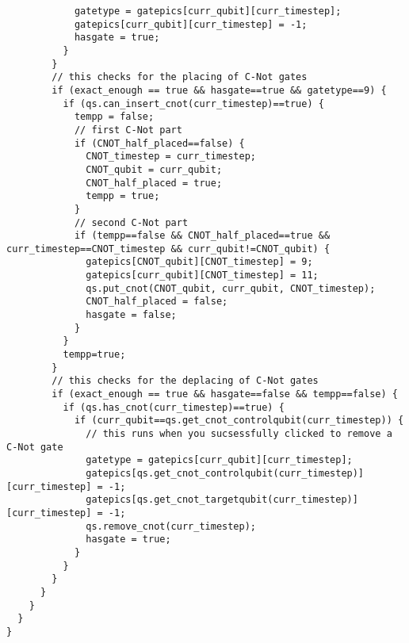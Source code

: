 \documentclass[12pt]{report}
\begin{document}
\begin{lstlisting}
            gatetype = gatepics[curr_qubit][curr_timestep];
            gatepics[curr_qubit][curr_timestep] = -1;
            hasgate = true;
          }
        }
        // this checks for the placing of C-Not gates
        if (exact_enough == true && hasgate==true && gatetype==9) {
          if (qs.can_insert_cnot(curr_timestep)==true) {
            tempp = false;
            // first C-Not part
            if (CNOT_half_placed==false) {
              CNOT_timestep = curr_timestep;
              CNOT_qubit = curr_qubit;
              CNOT_half_placed = true;
              tempp = true;
            }
            // second C-Not part
            if (tempp==false && CNOT_half_placed==true && curr_timestep==CNOT_timestep && curr_qubit!=CNOT_qubit) {
              gatepics[CNOT_qubit][CNOT_timestep] = 9;
              gatepics[curr_qubit][CNOT_timestep] = 11;
              qs.put_cnot(CNOT_qubit, curr_qubit, CNOT_timestep);
              CNOT_half_placed = false;
              hasgate = false;
            }
          }
          tempp=true;
        }
        // this checks for the deplacing of C-Not gates
        if (exact_enough == true && hasgate==false && tempp==false) {
          if (qs.has_cnot(curr_timestep)==true) {
            if (curr_qubit==qs.get_cnot_controlqubit(curr_timestep)) {
              // this runs when you sucsessfully clicked to remove a C-Not gate
              gatetype = gatepics[curr_qubit][curr_timestep];
              gatepics[qs.get_cnot_controlqubit(curr_timestep)][curr_timestep] = -1;
              gatepics[qs.get_cnot_targetqubit(curr_timestep)][curr_timestep] = -1;
              qs.remove_cnot(curr_timestep);
              hasgate = true;
            }
          }
        }
      }
    }
  }
}


\end{lstlisting}
\end{document}
